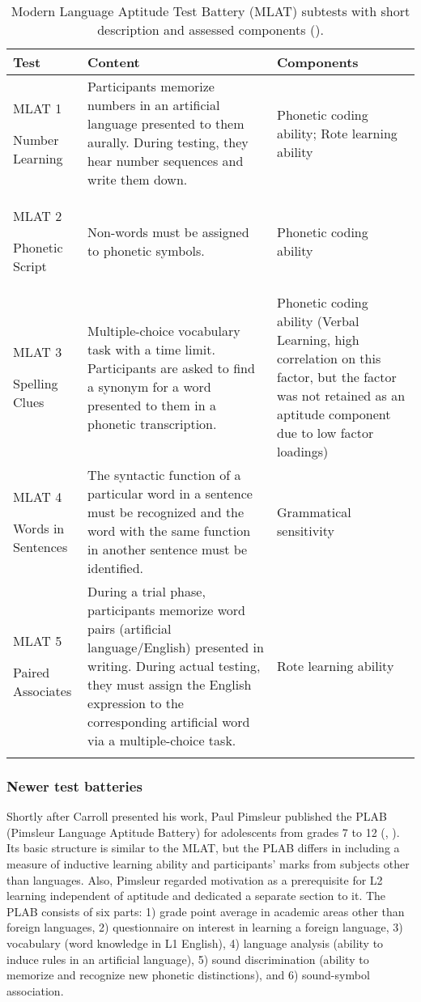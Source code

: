 \documentclass[output=paper]{langscibook}
\begin{document}
\begin{sidewaystable}
\caption{Modern Language Aptitude Test Battery (MLAT) subtests with short description and assessed components (\citealt{CarrollSapon1959}).\label{tab:01:1}}
\begin{tabularx}{\textwidth}{lQQ}
\lsptoprule
Test & Content & Components\\\midrule
{MLAT 1}

{Number Learning} & {Participants memorize numbers in an artificial language presented to them aurally. During testing, they hear number sequences and write them down.} & {Phonetic coding ability; Rote learning ability}\\
{MLAT 2}

{Phonetic Script} & {Non-words must be assigned to phonetic symbols.} & {Phonetic coding ability}\\
{MLAT 3}

{Spelling Clues} & {Multiple-choice vocabulary task with a time limit. Participants are asked to find a synonym for a word presented to them in a phonetic transcription.} & {Phonetic coding ability (Verbal Learning, high correlation on this factor, but the factor was not retained as an aptitude component due to low factor loadings)}\\
{MLAT 4}

{Words in Sentences} & {The syntactic function of a particular word in a sentence must be recognized and the word with the same function in another sentence must be identified.} & {Grammatical sensitivity}\\
{MLAT 5}

{Paired Associates} & {During a trial phase, participants memorize word pairs (artificial language/English) presented in writing. During actual testing, they must assign the English expression to the corresponding artificial word via a multiple-choice task.} & {Rote learning ability}\\
\lspbottomrule
\end{tabularx}
\end{sidewaystable}


\subsubsection{Newer test batteries}\label{sec:01:2.1.1} %

Shortly after Carroll presented his work, Paul Pimsleur published the PLAB (Pimsleur Language Aptitude Battery) for adolescents from grades 7 to 12 (\citealt{Pimsleur1966}, \citealt{PimsleurQuinn1971}). Its basic structure is similar to the MLAT, but the PLAB differs in including a measure of inductive learning ability and participants’ marks from subjects other than languages. Also, Pimsleur regarded motivation as a prerequisite for L2 learning independent of aptitude and dedicated a separate section to it. The PLAB consists of six parts: 1) grade point average in academic areas other than foreign languages, 2) questionnaire on interest in learning a foreign language, 3) vocabulary (word knowledge in L1 English), 4) language analysis (ability to induce rules in an artificial language), 5) sound discrimination (ability to memorize and recognize new phonetic distinctions), and 6) sound-symbol association.
\end{document}
